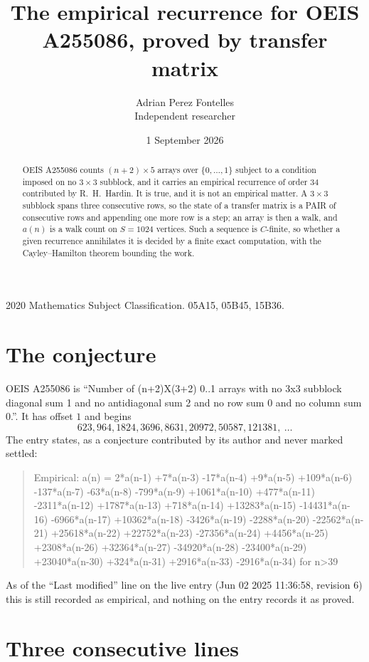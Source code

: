 \documentclass[11pt,a4paper]{article}
\title{The empirical recurrence for OEIS A255086, proved by transfer matrix}
\author{Adrian Perez Fontelles\\ \small Independent researcher}
\date{1 September 2026}
\theoremstyle{plain}
\theoremstyle{definition}
\begin{document}
\maketitle

\begin{abstract}
OEIS A255086 counts $(n+2)\times5$ arrays over $\{0,\dots,1\}$ subject to a condition imposed on
no $3\times3$ subblock, and it carries an empirical recurrence of order $34$
contributed by R.~H.~Hardin. It is true, and it is not an empirical matter. A $3\times3$
subblock spans three consecutive rows, so the state of a transfer matrix is a PAIR of
consecutive rows and appending one more row is a step; an array is then a walk, and
$a(n)$ is a walk count on $S=1024$ vertices. Such a sequence is $C$-finite, so whether a given
recurrence annihilates it is decided by a finite exact computation, with the Cayley--Hamilton
theorem bounding the work.
\end{abstract}

\noindent\small 2020 Mathematics Subject Classification. 05A15, 05B45, 15B36.\normalsize

\section{The conjecture}

OEIS A255086 is ``Number of (n+2)X(3+2) 0..1 arrays with no 3x3 subblock diagonal sum 1 and no antidiagonal sum 2 and no row sum 0 and no column sum 0.''. It has offset $1$ and begins
\[
623, 964, 1824, 3696, 8631, 20972, 50587, 121381,\ \dots
\]
The entry states, as a conjecture contributed by its author and never marked settled:
\begin{quote}
Empirical: a(n) = 2*a(n-1) +7*a(n-3) -17*a(n-4) +9*a(n-5) +109*a(n-6) -137*a(n-7) -63*a(n-8) -799*a(n-9) +1061*a(n-10) +477*a(n-11) -2311*a(n-12) +1787*a(n-13) +718*a(n-14) +13283*a(n-15) -14431*a(n-16) -6966*a(n-17) +10362*a(n-18) -3426*a(n-19) -2288*a(n-20) -22562*a(n-21) +25618*a(n-22) +22752*a(n-23) -27356*a(n-24) +4456*a(n-25) +2308*a(n-26) +32364*a(n-27) -34920*a(n-28) -23400*a(n-29) +23040*a(n-30) +324*a(n-31) +2916*a(n-33) -2916*a(n-34) for n>39
\end{quote}
As of the ``Last modified'' line on the live entry (Jun 02 2025 11:36:58, revision 6) this is still
recorded as empirical, and nothing on the entry records it as proved.

\section{Three consecutive lines}
\end{document}
